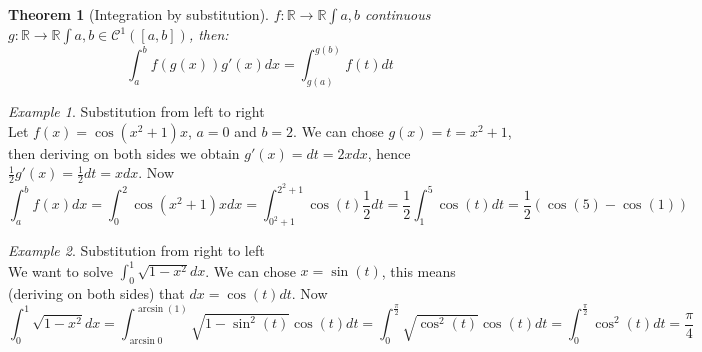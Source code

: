 \documentclass{article}
\newcommand{\fOnR}[1]{#1 : \mathbb{R} \rightarrow \mathbb{R}}
\newcommand{\intcc}[1]{\left[#1\right]}
\theoremstyle{definition}
\theoremstyle{definition}
\theoremstyle{plain}
\newtheorem{theorem}{Theorem}[section]
\theoremstyle{plain}
\theoremstyle{plain}
\theoremstyle{plain}
\theoremstyle{definition}
\theoremstyle{remark}
\theoremstyle{remark}
\theoremstyle{remark}
\newtheorem{examplet}{Example}[theorem]
\theoremstyle{remark}
\newcommand{\C}{\mathcal{C}}
\begin{document}
\begin{theorem}[Integration by substitution]
  $\fOnR{f}{\int{a,b}}$ continuous $\fOnR{g}{\int{a,b}} \in \C^1(\intcc{a,b})$, then:
  \[
    \int_a^b f(g(x))g'(x) dx = \int_{g(a)}^{g(b)} f(t) dt
  \]
\end{theorem}

\begin{examplet}
  Substitution from left to right\\
  Let $f(x) = \cos(x^2 + 1) x$, $a = 0$ and $b = 2$. We can chose $g(x) = t = x^2 + 1$, then deriving on both sides we obtain $g'(x) = dt = 2x dx$, hence $\frac{1}{2} g'(x) = \frac{1}{2} dt = x dx$. Now
  \[
  \int_a^b f(x) dx =
  \int_0^2 \cos(x^2 + 1) x dx =
  \int_{0^2+1}^{2^2+1} \cos(t) \frac{1}{2} dt =
  \frac{1}{2} \int_1^5 \cos(t) dt =
  \frac{1}{2} \left(\cos(5) - \cos(1)\right)
  \]
\end{examplet}

\begin{examplet}
  Substitution from right to left\\
  We want to solve $\int_0^1 \sqrt{1-x^2}dx$. We can chose $x = \sin(t)$, this means (deriving on both sides) that $dx = \cos(t)dt$. Now
  \[
  \int_0^1 \sqrt{1-x^2} dx =
  \int_{\arcsin{0}}^{\arcsin(1)} \sqrt{1-\sin^2(t)} \cos(t) dt =
  \int_0^{\frac{\pi}{2}} \sqrt{\cos^2(t)} \cos(t) dt =
  \int_0^{\frac{\pi}{2}} \cos^2(t) dt =
  \frac{\pi}{4}
  \]
\end{examplet}


\end{document}

